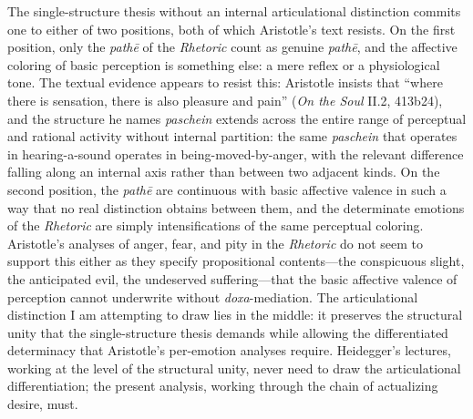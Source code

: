 \documentclass{article}
\begin{document}
The single-structure thesis without an internal articulational distinction commits one to either of two positions, both of which Aristotle's text resists. On the first position, only the \textit{pathē} of the \textit{Rhetoric} count as genuine \textit{pathē}, and the affective coloring of basic perception is something else: a mere reflex or a physiological tone. The textual evidence appears to resist this: Aristotle insists that ``where there is sensation, there is also pleasure and pain'' (\textit{On the Soul} II.2, 413b24), and the structure he names \textit{paschein} extends across the entire range of perceptual and rational activity without internal partition: the same \textit{paschein} that operates in hearing-a-sound operates in being-moved-by-anger, with the relevant difference falling along an internal axis rather than between two adjacent kinds. On the second position, the \textit{pathē} are continuous with basic affective valence in such a way that no real distinction obtains between them, and the determinate emotions of the \textit{Rhetoric} are simply intensifications of the same perceptual coloring. Aristotle's analyses of anger, fear, and pity in the \textit{Rhetoric} do not seem to support this either as they specify propositional contents---the conspicuous slight, the anticipated evil, the undeserved suffering---that the basic affective valence of perception cannot underwrite without \textit{doxa}-mediation. The articulational distinction I am attempting to draw lies in the middle: it preserves the structural unity that the single-structure thesis demands while allowing the differentiated determinacy that Aristotle's per-emotion analyses require. Heidegger's lectures, working at the level of the structural unity, never need to draw the articulational differentiation; the present analysis, working through the chain of actualizing desire, must.
\end{document}
